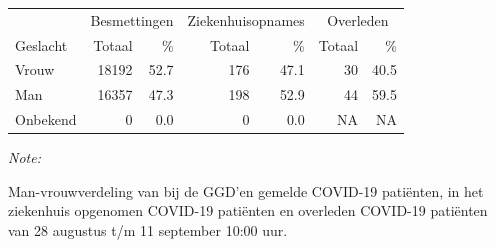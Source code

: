 \documentclass[
  english,
  man,floatsintext]{apa6}
\begin{document}
\begin{table}
\centering\begingroup\fontsize{11}{13}\selectfont

\begin{threeparttable}
\begin{tabular}{lrrrrrr}
\toprule
\multicolumn{1}{c}{ } & \multicolumn{2}{c}{Besmettingen} & \multicolumn{2}{c}{Ziekenhuisopnames} & \multicolumn{2}{c}{Overleden} \\
\cmidrule(l{3pt}r{3pt}){2-3} \cmidrule(l{3pt}r{3pt}){4-5} \cmidrule(l{3pt}r{3pt}){6-7}
Geslacht & Totaal & \% & Totaal & \% & Totaal & \%\\
\midrule
Vrouw & 18192 & 52.7 & 176 & 47.1 & 30 & 40.5\\
Man & 16357 & 47.3 & 198 & 52.9 & 44 & 59.5\\
Onbekend & 0 & 0.0 & 0 & 0.0 & NA & NA\\
\bottomrule
\end{tabular}
\begin{tablenotes}
\item \textit{Note: } 
\item Man-vrouwverdeling van bij de GGD’en gemelde COVID-19 patiënten, in het ziekenhuis opgenomen COVID-19 patiënten en overleden COVID-19 patiënten van 28 augustus t/m 11 september 10:00 uur.
\end{tablenotes}
\end{threeparttable}
\endgroup{}
\end{table}
\newpage
\end{document}
